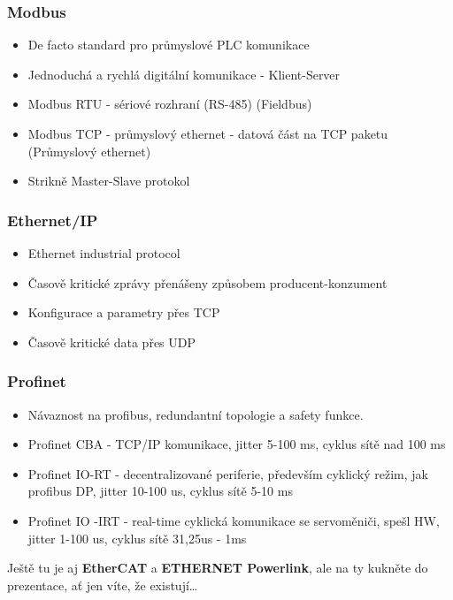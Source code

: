 \subsubsection*{Modbus}
\begin{itemize}
  \item De facto standard pro průmyslové PLC komunikace
  \item Jednoduchá a rychlá digitální komunikace - Klient-Server
  \item Modbus RTU - sériové rozhraní (RS-485) (Fieldbus)
  \item Modbus TCP - průmyslový ethernet - datová část na TCP paketu (Průmyslový ethernet)
  \item Strikně Master-Slave protokol
\end{itemize}

\subsubsection*{Ethernet/IP}
\begin{itemize}
  \item Ethernet industrial protocol
  \item Časově kritické zprávy přenášeny způsobem producent-konzument
  \item Konfigurace a parametry přes TCP 
  \item Časově kritické data přes UDP
\end{itemize}

\subsubsection*{Profinet}
\begin{itemize}
  \item Návaznost na profibus, redundantní topologie a safety funkce.
  \item Profinet CBA - TCP/IP komunikace, jitter 5-100 ms, cyklus sítě nad 100 ms
  \item Profinet IO-RT - decentralizované periferie, především cyklický režim, jak profibus DP, jitter 10-100 us, cyklus sítě 5-10 ms
  \item Profinet IO -IRT - real-time cyklická komunikace se servoměniči, spešl HW, jitter 1-100 us, cyklus sítě 31,25us - 1ms
\end{itemize}

Ještě tu je aj \textbf{EtherCAT} a \textbf{ETHERNET Powerlink}, ale na ty kukněte do prezentace, ať jen víte, že existují\dots

